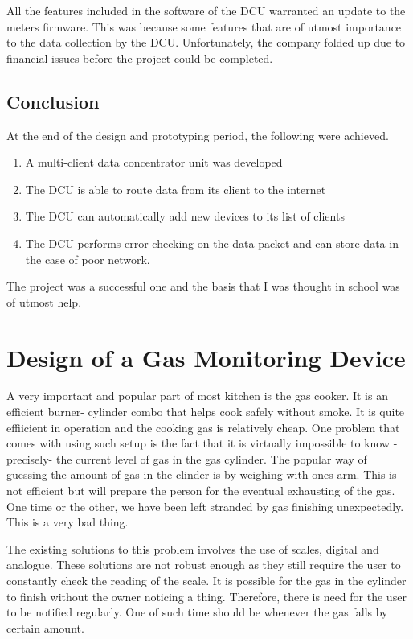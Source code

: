All the features included in the software of the DCU warranted an update to the meters firmware. This was because some features that are of utmost importance to the data collection by the DCU. Unfortunately, the company folded up due to financial issues before the project could be completed.

\subsection{Conclusion}
At the end of the design and prototyping period, the following were achieved.
\begin{enumerate}
\item A multi-client data concentrator unit was developed
\item The DCU is able to route data from its client to the internet
\item The DCU can automatically add new devices to its list of clients
\item The DCU performs error checking on the data packet and can store data in the case of poor network.
\end{enumerate}

The project was a successful one and the basis that I was thought in school was of utmost help.
 
\section{Design of a Gas Monitoring Device} 
A very important and popular part of most kitchen is the gas cooker. It is an efficient burner- cylinder combo that helps cook safely without smoke. It is quite effiicient in operation and the cooking gas is relatively cheap. One problem that comes with using such setup is the fact that it is virtually impossible to know -precisely- the current level of gas in the gas cylinder. The popular way of guessing the amount of gas in the clinder is by weighing with ones arm. This is not efficient but will prepare the person for the eventual exhausting of the gas. One time or the other, we have been left stranded by gas finishing unexpectedly. This is a very bad thing.

The existing solutions to this problem involves the use of scales, digital and analogue. These solutions are not robust enough as they still require the user to constantly check the reading of the scale. It is possible for the gas in the cylinder to finish without the owner noticing a thing. Therefore, there is need for the user to be notified regularly. One of such time should be whenever the gas falls by certain amount. 

